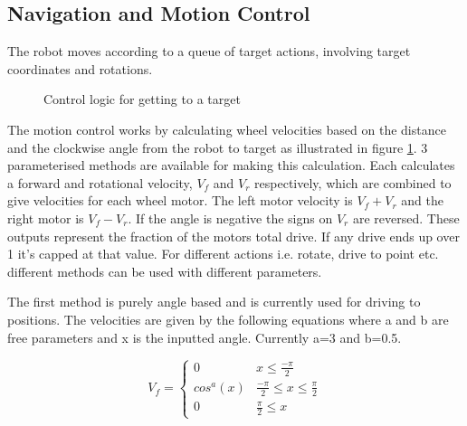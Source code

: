 
\subsection{Navigation and Motion Control}
\label{subsec:motion}

The robot moves according to a queue of target actions, involving target coordinates and rotations.

\begin{figure}[H]
    \centering
    
    \caption{Control logic for getting to a target}
    \label{fig:flow_motion}
\end{figure}


The motion control works by calculating wheel velocities based on the distance and the clockwise angle from the robot to target as illustrated in figure \ref{fig:flow_motion}. 3 parameterised methods are available for making this calculation. Each calculates a forward and rotational velocity, $V_f$ and $V_r$ respectively, which are combined to give velocities for each wheel motor. The left motor velocity is $V_f + V_r$ and the right motor is $V_f - V_r$. If the angle is negative the signs on $V_r$ are reversed. These outputs represent the fraction of the motors total drive. If any drive ends up over 1 it's capped at that value. For different actions i.e. rotate, drive to point etc. different methods can be used with different parameters.

The first method is purely angle based and is currently used for driving to positions. The velocities are given by the following equations where a and b are free parameters and x is the inputted angle. Currently a=3 and b=0.5.

\begin{equation}
    V_f =
    \begin{cases}
      0 & x\leq \frac{-\pi}{2} \\
      cos^a(x) & \frac{-\pi}{2} \leq x\leq \frac{\pi}{2} \\
      0 & \frac{\pi}{2} \leq x
   \end{cases}
\end{equation}

